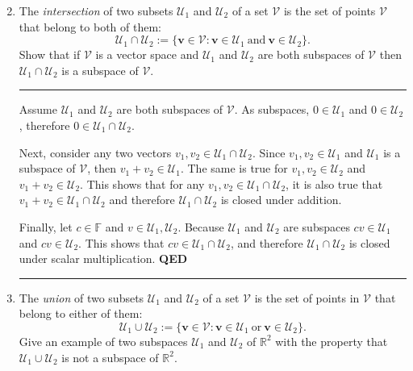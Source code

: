 \documentclass[12pt]{amsart}
\newcommand{\1}{\mathbbm{1}}
\numberwithin{equation}{section}
\numberwithin{Theorem}{section}
\theoremstyle{plain} %
\theoremstyle{definition}
\theoremstyle{remark}
\begin{document}
\clearpage

\begin{enumerate}[1.]
\setcounter{enumi}{1}
\item
The \textit{intersection} of two subsets $\mathcal{U}_1$ and $\mathcal{U}_2$ of a set $\mathcal{V}$ is the set of points $\mathcal{V}$ that belong to both of them:
\begin{equation*}
\mathcal{U}_1\cap\mathcal{U}_2:=\{\mathbf{v}\in\mathcal{V}: \mathbf{v}\in\mathcal{U}_1\ \text{and}\ \mathbf{v}\in\mathcal{U}_2\}.
\end{equation*}
Show that if $\mathcal{V}$ is a vector space and $\mathcal{U}_1$ and $\mathcal{U}_2$ are both subspaces of $\mathcal{V}$ then $\mathcal{U}_1\cap\mathcal{U}_2$ is a subspace of $\mathcal{V}$.\bigskip

\hrule\bigskip

Assume $\mathcal{U}_1$ and $\mathcal{U}_2$ are both subspaces of $\mathcal{V}$.
As subspaces, $0\in\mathcal{U}_1$ and $0\in\mathcal{U}_2$, 
therefore $0\in\mathcal{U}_1\cap\mathcal{U}_2$.
\smallskip

Next, consider any two vectors $v_1,v_2\in\mathcal{U}_1\cap\mathcal{U}_2$.
Since $v_1,v_2\in\mathcal{U}_1$ and $\mathcal{U}_1$ is a subspace of $\mathcal{V}$, 
then $v_1+v_2\in\mathcal{U}_1$. 
The same is true for $v_1,v_2\in\mathcal{U}_2$ and $v_1+v_2\in\mathcal{U}_2$.
This shows that for any $v_1,v_2\in\mathcal{U}_1\cap\mathcal{U}_2$,
it is also true that $v_1+v_2\in\mathcal{U}_1\cap\mathcal{U}_2$
and therefore $\mathcal{U}_1\cap\mathcal{U}_2$ is closed under addition. 
\smallskip

Finally, let $c\in\mathbb{F}$ and $v\in\mathcal{U}_1,\mathcal{U}_2$.
Because $\mathcal{U}_1$ and $\mathcal{U}_2$ are subspaces 
$cv\in\mathcal{U}_1$ and $cv\in\mathcal{U}_2$. 
This shows that $cv\in\mathcal{U}_1\cap\mathcal{U}_2$, 
and therefore $\mathcal{U}_1\cap\mathcal{U}_2$ is closed under scalar multiplication.
\textbf{QED}

\bigskip\hrule\bigskip
\item
The \textit{union} of two subsets $\mathcal{U}_1$ and $\mathcal{U}_2$ of a set $\mathcal{V}$ is the set of points in $\mathcal{V}$ that belong to either of them:
\begin{equation*}
\mathcal{U}_1\cup\mathcal{U}_2:=\{\mathbf{v}\in\mathcal{V}: \mathbf{v}\in\mathcal{U}_1\ \text{or}\ \mathbf{v}\in\mathcal{U}_2\}.
\end{equation*}
Give an example of two subspaces $\mathcal{U}_1$ and $\mathcal{U}_2$ of $\mathbb{R}^2$ with the property that $\mathcal{U}_1\cup\mathcal{U}_2$ is not a subspace of $\mathbb{R}^2$.\bigskip


\end{enumerate}
\end{document}
